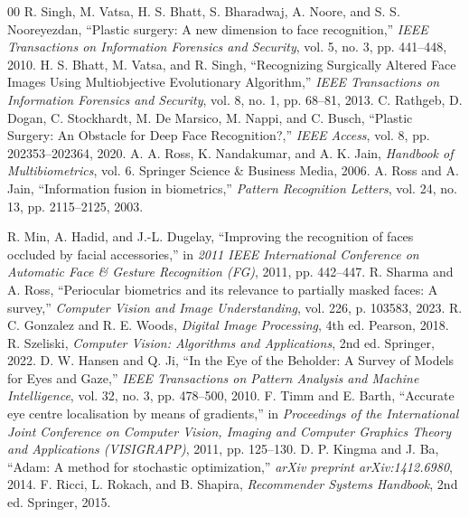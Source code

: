 \documentclass{article} %
\begin{document}
\begin{thebibliography}{00}
 R. Singh, M. Vatsa, H. S. Bhatt, S. Bharadwaj, A. Noore, and S. S. Nooreyezdan, ``Plastic surgery: A new dimension to face recognition,'' \textit{IEEE Transactions on Information Forensics and Security}, vol. 5, no. 3, pp. 441--448, 2010.
 H. S. Bhatt, M. Vatsa, and R. Singh, ``Recognizing Surgically Altered Face Images Using Multiobjective Evolutionary Algorithm,'' \textit{IEEE Transactions on Information Forensics and Security}, vol. 8, no. 1, pp. 68--81, 2013.
 C. Rathgeb, D. Dogan, C. Stockhardt, M. De Marsico, M. Nappi, and C. Busch, ``Plastic Surgery: An Obstacle for Deep Face Recognition?,'' \textit{IEEE Access}, vol. 8, pp. 202353--202364, 2020.
 A. A. Ross, K. Nandakumar, and A. K. Jain, \textit{Handbook of Multibiometrics}, vol. 6. Springer Science \& Business Media, 2006.
 A. Ross and A. Jain, ``Information fusion in biometrics,'' \textit{Pattern Recognition Letters}, vol. 24, no. 13, pp. 2115--2125, 2003.

 R. Min, A. Hadid, and J.-L. Dugelay, ``Improving the recognition of faces occluded by facial accessories,'' in \textit{2011 IEEE International Conference on Automatic Face \& Gesture Recognition (FG)}, 2011, pp. 442--447.
 R. Sharma and A. Ross, ``Periocular biometrics and its relevance to partially masked faces: A survey,'' \textit{Computer Vision and Image Understanding}, vol. 226, p. 103583, 2023.
 R. C. Gonzalez and R. E. Woods, \textit{Digital Image Processing}, 4th ed. Pearson, 2018.
 R. Szeliski, \textit{Computer Vision: Algorithms and Applications}, 2nd ed. Springer, 2022.
 D. W. Hansen and Q. Ji, ``In the Eye of the Beholder: A Survey of Models for Eyes and Gaze,'' \textit{IEEE Transactions on Pattern Analysis and Machine Intelligence}, vol. 32, no. 3, pp. 478--500, 2010.
 F. Timm and E. Barth, ``Accurate eye centre localisation by means of gradients,'' in \textit{Proceedings of the International Joint Conference on Computer Vision, Imaging and Computer Graphics Theory and Applications (VISIGRAPP)}, 2011, pp. 125--130.
 D. P. Kingma and J. Ba, ``Adam: A method for stochastic optimization,'' \textit{arXiv preprint arXiv:1412.6980}, 2014.
 F. Ricci, L. Rokach, and B. Shapira, \textit{Recommender Systems Handbook}, 2nd ed. Springer, 2015.
\end{thebibliography}

\newpage

\end{document}
